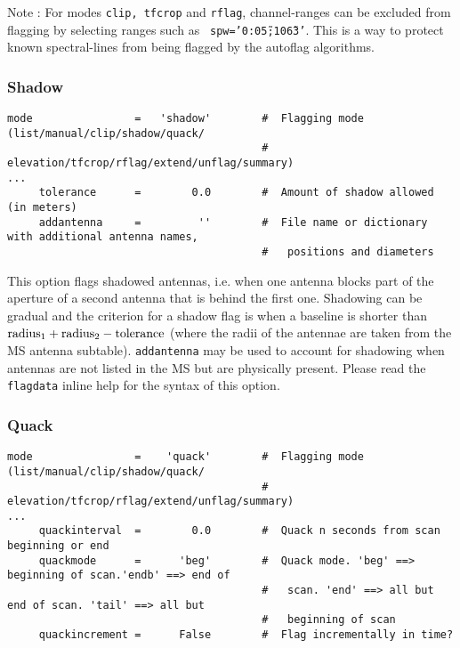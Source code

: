 Note : For modes {\tt clip, tfcrop} and {\tt rflag}, channel-ranges
can be excluded from flagging by selecting ranges such as {\tt
  spw='0:0\~5;10\~63'}. This is a way to protect known spectral-lines
from being flagged by the autoflag algorithms.


\subsubsection{Shadow}
\label{section:edit.flagdata.mode.shadow}

\small
\begin{verbatim}
mode                =   'shadow'        #  Flagging mode (list/manual/clip/shadow/quack/
                                        #  elevation/tfcrop/rflag/extend/unflag/summary)
...
     tolerance      =        0.0        #  Amount of shadow allowed (in meters)
     addantenna     =         ''        #  File name or dictionary with additional antenna names,
                                        #   positions and diameters
\end{verbatim}

\normalsize 

This option flags shadowed antennas, i.e. when one antenna blocks
part of the aperture of a second antenna that is behind the first
one. Shadowing can be gradual and the criterion for a shadow flag is
when a baseline is shorter than ${\rm radius}_1 + {\rm radius}_2 - {\rm tolerance}$
(where the radii of the antennae are taken from the MS antenna
subtable). {\tt addantenna} may be used to account for shadowing when
antennas are not listed in the MS but are physically present. Please
read the {\tt flagdata} inline help for the syntax of this option.


\subsubsection{Quack}
\label{section:edit.flagdata.mode.quack}
\small
\begin{verbatim}
mode                =    'quack'        #  Flagging mode (list/manual/clip/shadow/quack/
                                        #   elevation/tfcrop/rflag/extend/unflag/summary)
...
     quackinterval  =        0.0        #  Quack n seconds from scan beginning or end
     quackmode      =      'beg'        #  Quack mode. 'beg' ==> beginning of scan.'endb' ==> end of
                                        #   scan. 'end' ==> all but end of scan. 'tail' ==> all but
                                        #   beginning of scan
     quackincrement =      False        #  Flag incrementally in time?
\end{verbatim}
\normalsize

